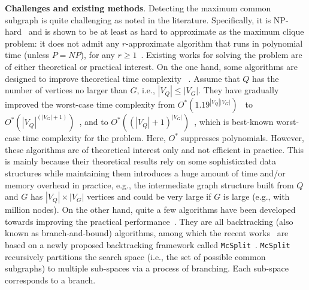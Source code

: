 \smallskip
\noindent\textbf{Challenges and {\chengC existing} methods}. Detecting the maximum common subgraph is quite  challenging as noted in the literature. Specifically, it is NP-hard~\cite{lewis1983michael} and is shown to be {\YuiR at least as hard to approximate as the maximum clique problem: it does not admit any $r$-approximate algorithm that runs in polynomial time (unless $P=NP$), for any $r\geq 1$~\cite{kann1992approximability}.}
%
%
{\Yui Existing works for solving the problem are of either theoretical or practical interest. On the one hand, some algorithms are designed 
{\chengB to improve theoretical time complexity}
~\cite{abu2014maximum,levi1973note,krissinel2004common,suters2005new}. {\revision Assume that $Q$ has the number of vertices no larger than $G$, i.e., $|V_Q|\leq |V_G|$.} They have gradually improved the worst-case time complexity from $O^*(1.19^{|V_Q||V_G|})$~\cite{levi1973note} to $O^*(|V_Q|^{(|V_G|+1)})$~\cite{krissinel2004common}, and to $O^*((|V_Q|+1)^{|V_G|})$~\cite{suters2005new}, 
{\chengB which is  best-known worst-case time complexity for the problem.} Here, $O^*$ suppresses polynomials.
However, these algorithms are of theoretical interest only and not efficient in practice. {\YuiRR This is mainly because their theoretical results rely on some sophisticated data structures while maintaining them introduces a huge amount of time and/or memory overhead in practice, e.g., the intermediate graph structure built from $Q$ and $G$ has $|V_Q|\times |V_G|$ vertices and could be very large if $G$ is large (e.g., with million nodes).}
%
On the other hand, quite a few algorithms have been developed {\YuiR towards improving the practical performance}~\cite{levi1973note,mcgregor1982backtrack,mccreesh2016clique,vismara2008finding,zhoustrengthened,liu2020learning,liu2023hybrid,mccreesh2017partitioning}. They are all backtracking (also known as branch-and-bound) algorithms, among which the recent works~\cite{zhoustrengthened,liu2020learning,liu2023hybrid} are based on a newly proposed backtracking framework called \texttt{McSplit}~\cite{mccreesh2017partitioning}. \texttt{McSplit} recursively partitions the search space (i.e., the set of possible common subgraphs) to multiple sub-spaces via a process of branching. Each sub-space corresponds to a branch. 
}
